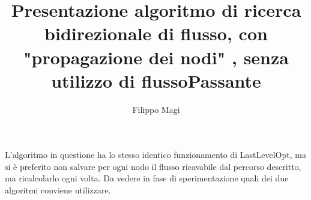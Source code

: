 \documentclass{article}
\title{Presentazione algoritmo di ricerca bidirezionale di flusso, con "propagazione dei nodi" , senza utilizzo di flussoPassante}
\author{Filippo Magi }
\begin{document}
\maketitle

L'algoritmo in questione ha lo stesso identico funzionamento di LastLevelOpt, ma si è preferito non salvare per ogni nodo il flusso ricavabile dal percorso
descritto, ma ricalcolarlo ogni volta.
Da vedere in fase di sperimentazione quali dei due algoritmi conviene utilizzare.
\end{document}
